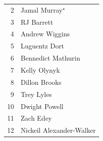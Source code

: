 \documentclass[11pt,letterpaper]{article}
\begin{document}
\begin{table}[htbp]
\begin{minipage}{0.45\textwidth}
\begin{tabular}{r l}
      2  & Jamal Murray$^{\star}$           \\
      3  & RJ Barrett                       \\
      4  & Andrew Wiggins                   \\
      5  & Luguentz Dort                    \\
      6  & Bennedict Mathurin               \\
      7  & Kelly Olynyk                     \\
      8  & Dillon Brooks                    \\
      9  & Trey Lyles                       \\
      10 & Dwight Powell                    \\
      11 & Zach Edey                        \\
      12 & Nickeil Alexander-Walker         \\
      \bottomrule
    \end{tabular}
  \end{minipage}
\end{table}
\end{document}
